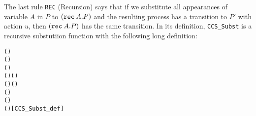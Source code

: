 The last rule \texttt{REC} (Recursion)
 says that if we substitute all appearances of variable $A$ in $P$ to
$({\tt rec}\: A . P)$ and the resulting process has a transition to $P'$
with action $u$, then $({\tt rec}\: A . P)$ has the same
transition. In its definition, \texttt{CCS_Subst} is a recursive substutiion function
with the following long definition:
\begin{alltt}
    \HOLSymConst{\HOLTokenDefEquality{}} 
 ()   \HOLSymConst{\HOLTokenDefEquality{}}    
 ( \HOLSymConst{\ensuremath{+}} )   \HOLSymConst{\HOLTokenDefEquality{}}
      \HOLSymConst{\ensuremath{+}}    
 ( \HOLSymConst{\ensuremath{\parallel}} )   \HOLSymConst{\HOLTokenDefEquality{}}
      \HOLSymConst{\ensuremath{\parallel}}    
 (\HOLSymConst{\ensuremath{\nu}}  )   \HOLSymConst{\HOLTokenDefEquality{}} \HOLSymConst{\ensuremath{\nu}}  (   )
 (  )   \HOLSymConst{\HOLTokenDefEquality{}}  (   ) 
 ( )   \HOLSymConst{\HOLTokenDefEquality{}}   \HOLSymConst{=}      
 (\HOLSymConst{\ensuremath{\mu}}  )   \HOLSymConst{\HOLTokenDefEquality{}}
    \HOLSymConst{=}   \HOLSymConst{\ensuremath{\mu}}    \HOLSymConst{\ensuremath{\mu}}  (   )\hfill{[CCS_Subst_def]}
\end{alltt}

